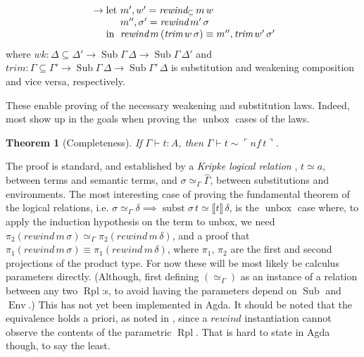\documentclass{article}
\newtheorem{theorem}{Theorem}
\DeclareMathOperator\unbox{unbox}
\begin{document}
\begin{itemize}
\begin{align*}
    &&&\rightarrow
    \begin{array}[t]{@{}l@{}l@{}}
      \text{let } & m' , w' = \textit{rewind}_\subseteq \, m \, w \\
      & m'' , \sigma' = \textit{rewind} \, m' \, \sigma \\
      \text{in } & \textit{rewind} \, m \, (\textit{trim} \, w \, \sigma) \equiv m'' , \textit{trim} \, w' \, \sigma'
    \end{array}
  \end{align*}
  where $\textit{wk} : \Delta\subseteq\Delta' \rightarrow \operatorname{Sub} \Gamma \, \Delta \rightarrow \operatorname{Sub} \Gamma \, \Delta'$ and
  $\textit{trim} : \Gamma\subseteq\Gamma' \rightarrow \operatorname{Sub} \Gamma \, \Delta \rightarrow \operatorname{Sub} \Gamma' \, \Delta$
  is substitution and weakening composition and vice versa, respectively.
\end{itemize}
These enable proving of the necessary weakening and substitution laws.
Indeed, most show up in the goals when proving the $\unbox$ cases of the laws.

\begin{theorem}[Completeness]
  If $\Gamma \vdash t : A$, then $\Gamma \vdash t \sim \ulcorner \textit{nf} \, t \urcorner$.
\end{theorem}

The proof is standard,
and established by a \emph{Kripke logical relation} \cite{kovacs17},
$t \simeq a$, between terms and semantic terms,
and $\sigma \simeq_\Gamma \hat\Gamma$, between substitutions and environments.
The most interesting case of proving the fundamental theorem of the logical relations,
i.e. $\sigma \simeq_\Gamma \delta \implies \operatorname{subst} \sigma \, t \simeq \llbracket t \rrbracket \, \delta$,
is the $\unbox$ case
where, to apply the induction hypothesis on the term to unbox,
we need $\pi_2 (\textit{rewind} \, m \, \sigma) \simeq_\Gamma \pi_2 (\textit{rewind} \, m \, \delta)$,
and a proof that $\pi_1 (\textit{rewind} \, m \, \sigma) \equiv \pi_1 (\textit{rewind} \, m \, \delta)$,
where $\pi_1$, $\pi_2$ are the first and second projections of the product type.
For now these will be most likely be calculus parameters directly.
(Although, first defining $(\simeq_\Gamma)$ as an instance of a relation
between any two $\operatorname{Rpl}$:s,
to avoid having the parameters depend on $\operatorname{Sub}$ and $\operatorname{Env}$.)
This has not yet been implemented in Agda.
It should be noted that the equivalence holds a priori,
as noted in  \cite{wadler89},
since a $\textit{rewind}$ instantiation cannot observe
the contents of the parametric $\operatorname{Rpl}$.
That is hard to state in Agda though, to say the least.
\end{document}

